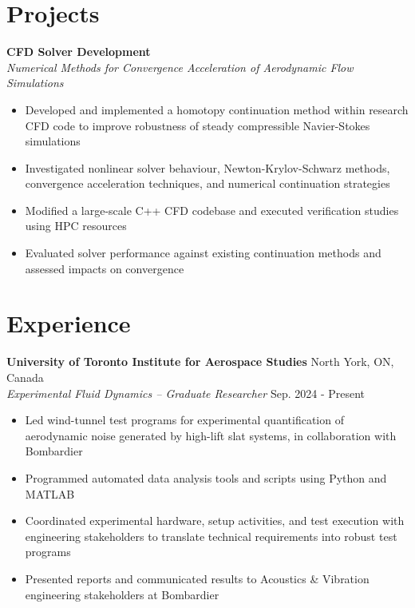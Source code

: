 \documentclass[a4paper,11pt]{article}
\begin{document}
\section{Projects}

    \textbf{CFD Solver Development} \\
    \textit{Numerical Methods for Convergence Acceleration of Aerodynamic Flow Simulations}
    \begin{itemize}
        \itemsep0em
        \item Developed and implemented a homotopy continuation method within research CFD code to improve robustness of steady compressible Navier-Stokes simulations
        \item Investigated nonlinear solver behaviour, Newton-Krylov-Schwarz methods, convergence acceleration techniques, and numerical continuation strategies
        \item Modified a large-scale C++ CFD codebase and executed verification studies using HPC resources
        \item Evaluated solver performance against existing continuation methods and assessed impacts on convergence
    \end{itemize}

\section{Experience}

    \textbf{University of Toronto Institute for Aerospace Studies}
    \hfill
    North York, ON, Canada \\
    \textit{Experimental Fluid Dynamics -- Graduate Researcher}
    \hfill
    Sep. 2024 - Present
    \begin{itemize}
        \itemsep0em
        \item Led wind-tunnel test programs for experimental quantification of aerodynamic noise generated by high-lift slat systems, in collaboration with Bombardier
        \item Programmed automated data analysis tools and scripts using Python and MATLAB
        \item Coordinated experimental hardware, setup activities, and test execution with engineering stakeholders to translate technical requirements into robust test programs
        \item Presented reports and communicated results to Acoustics \& Vibration engineering stakeholders at Bombardier
    \end{itemize}
\end{document}

